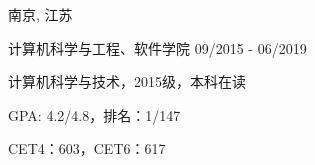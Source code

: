 \vspace{-4.0mm}

\begin{cventries}
\vspace{-1.5mm}
\cveducation
{}
{南京, 江苏}

\cvsubeducation
{计算机科学与工程、软件学院}
{09/2015 - 06/2019}
{
    \begin{cvitems}
    \item {计算机科学与技术，2015级，本科在读}
    \item {GPA: 4.2/4.8，排名：1/147}
    \item{CET4：603，CET6：617}
    \end{cvitems}
}

\end{cventries}